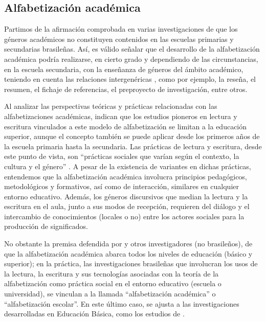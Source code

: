 \documentclass{textolivre}
\begin{document}
\subsection{Alfabetización académica}\label{sec-fmt-academica}
Partimos de la afirmación comprobada en varias investigaciones de que los géneros académicos no constituyen contenidos en las escuelas primarias y secundarias brasileñas. Así, es válido señalar que el desarrollo de la alfabetización académica podría realizarse, en cierto grado y dependiendo de las circunstancias, en la escuela secundaria, con la enseñanza de géneros del ámbito académico, teniendo en cuenta las relaciones intergenéricas \cite{correa_relacoes_2006}, como por ejemplo, la reseña, el resumen, el fichaje de referencias, el preproyecto de investigación, entre otros.

Al analizar las perspectivas teóricas y prácticas relacionadas con las alfabetizaciones académicas, \textcite{komesu_o_2014} indican que los estudios pioneros en lectura y escritura vinculados a este modelo de alfabetización se limitan a la educación superior, aunque el concepto también se puede aplicar desde los primeros años de la escuela primaria hasta la secundaria. Las prácticas de lectura y escritura, desde este punto de vista, son “prácticas sociales que varían según el contexto, la cultura y el género” \cite[p. 477]{komesu_o_2014}. A pesar de la existencia de variantes en dichas prácticas, entendemos que la alfabetización académica involucra principios pedagógicos, metodológicos y formativos, así como de interacción, similares en cualquier entorno educativo. Además, los géneros discursivos que median la lectura y la escritura en el aula, junto a sus modos de recepción, requieren del diálogo y el intercambio de conocimientos (locales o no) entre los actores sociales para la producción de significados.

No obstante la premisa defendida por \textcite{komesu_o_2014} y otros investigadores (no brasileños), de que la alfabetización académica abarca todos los niveles de educación (básico y superior); en la práctica, las investigaciones brasileñas que involucran los usos de la lectura, la escritura y sus tecnologías asociadas con la teoría de la alfabetización como práctica social en el entorno educativo (escuela o universidad), se vinculan a la llamada “alfabetización académica” o “alfabetización escolar”. En este último caso, se ajusta a las investigaciones desarrolladas en Educación Básica, como los estudios de \textcite{silva_pedagogia_2018, silva_plano_2020}.
\end{document}
